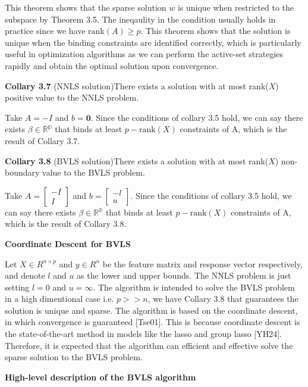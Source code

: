 \documentclass[11pt]{article}
\begin{document}
This theorem shows that the sparse solution $w$ is unique when restricted to the subspace by
Theorem 3.5. The ineqaulity in the condition usually holds in practice since we have 
$\text{rank}(A) \geq p$. This theorem shows that the solution is unique when the binding 
constraints are identified correctly, which is particularly useful in optimization
algorithms as we can perform the active-set strategies rapidly and obtain the optimal solution 
upon convergence.

\textbf{Collary 3.7} (NNLS solution)\quad There exists a solution with at most rank($X$) 
positive value to the NNLS problem.

Take $A = -I$ and $b = \pmb{0}$. Since the conditions of collary 3.5 hold, we can say there 
exists  $\beta \in \mathbb{R^p}$ that binds at least $p - \text{rank}(X)$ constraints of A, 
which is the result of Collary 3.7.
\newpage

\textbf{Collary 3.8} (BVLS solution)\quad There exists a solution with at most rank($X$) 
non-boundary value to the BVLS problem.

Take $A = \begin{bmatrix}
            -I\\
            I
         \end{bmatrix}$
and $b = \begin{bmatrix}
            -l \\
            u
        \end{bmatrix}$. 
Since the conditions of collary 3.5 hold, we can say there 
exists  $\beta \in \mathbb{R^p}$ that binds at least $p - \text{rank}(X)$ constraints of A, 
which is the result of Collary 3.8.

\textbf{Coordinate Descent for BVLS} 

Let $X \in R^{n \times p}$ and $y \in R^n$ be the feature matrix and response vector respectively,
and denote $l$ and $u$ as the lower and upper bounds. The NNLS problem is just setting $l = 0$ 
and $u = \infty$. The algorithm is intended to solve the BVLS problem in a high dimentional case 
i.e. $p >> n$, we have Collary 3.8 that guarantees the solution is unique and sparse. The 
algorithm is based on the coordinate descent, in which convergence is guaranteed [Tse01]. This 
is because coordinate descent is the state-of-the-art method in models like the lasso and group
lasso [YH24]. Therefore, it is expected that the algorithm can efficient and effective solve the 
sparse solution to the BVLS problem.

\textbf{High-level description of the BVLS algorithm} 
\end{document}
